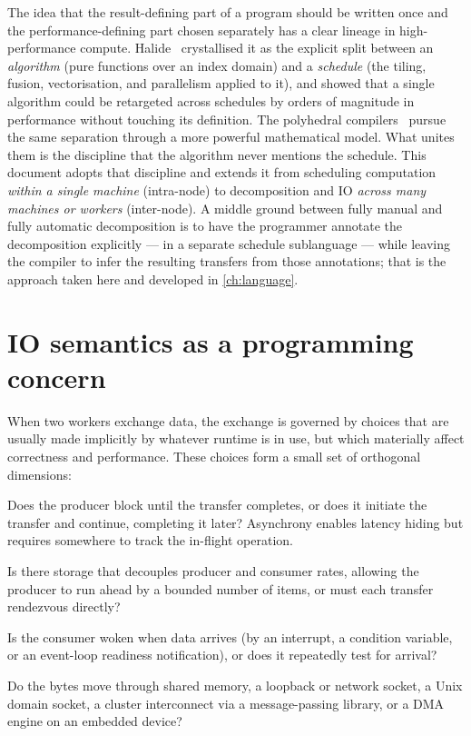 The idea that the result-defining part of a program should be written once and
the performance-defining part chosen separately has a clear lineage in
high-performance compute. Halide~\cite{ragan-kelley2013halide} crystallised it
as the explicit split between an \emph{algorithm} (pure functions over an index
domain) and a \emph{schedule} (the tiling, fusion, vectorisation, and
parallelism applied to it), and showed that a single algorithm could be
retargeted across schedules by orders of magnitude in performance without
touching its definition. The polyhedral
compilers~\cite{baghdadi2019tiramisu,bondhugula2008pluto} pursue the same
separation through a more powerful mathematical model. What unites them is the
discipline that the algorithm never mentions the schedule. This document
adopts that discipline and extends it from scheduling computation \emph{within a
single machine} (intra-node) to decomposition and IO \emph{across many machines
or workers} (inter-node). A middle ground between fully manual and fully
automatic decomposition is to have the programmer annotate the decomposition
explicitly --- in a separate schedule sublanguage --- while leaving the compiler
to infer the resulting transfers from those annotations; that is the approach
taken here and developed in \cref{ch:language}.

\section{IO semantics as a programming concern}\label{sec:bg-io}

When two workers exchange data, the exchange is governed by choices that are
usually made implicitly by whatever runtime is in use, but which materially
affect correctness and performance. These choices form a small set of orthogonal
dimensions:

\begin{description}[leftmargin=*]
  \item[Synchronous vs.\ asynchronous.] Does the producer block until the
        transfer completes, or does it initiate the transfer and continue,
        completing it later? Asynchrony enables latency hiding but requires
        somewhere to track the in-flight operation.
  \item[Buffered vs.\ unbuffered.] Is there storage that decouples producer and
        consumer rates, allowing the producer to run ahead by a bounded number
        of items, or must each transfer rendezvous directly?
  \item[Event-driven vs.\ polled.] Is the consumer woken when data arrives (by
        an interrupt, a condition variable, or an event-loop readiness
        notification), or does it repeatedly test for arrival?
  \item[Transport.] Do the bytes move through shared memory, a loopback or
        network socket, a Unix domain socket, a cluster interconnect via a
        message-passing library, or a DMA engine on an embedded device?
\end{description}

